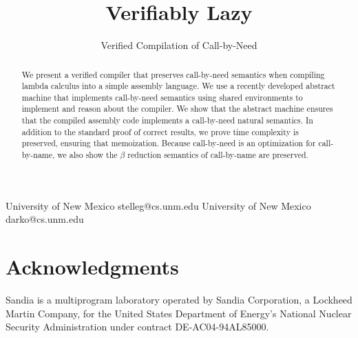 \documentclass[preprint]{sigplanconf}
\begin{document}
\copyrightdata{[to be supplied]} 


\title{Verifiably Lazy}
\subtitle{Verified Compilation of Call-by-Need}

           {University of New Mexico}
           {stelleg@cs.unm.edu}
           {University of New Mexico}
           {darko@cs.unm.edu}
\maketitle

\begin{abstract}
We present a verified compiler that preserves call-by-need semantics when
compiling lambda calculus into a simple assembly language. We use a recently
developed abstract machine that implements call-by-need semantics using shared
environments to implement and reason about the compiler. We show that the
abstract machine ensures that the compiled assembly code implements a
call-by-need natural semantics. In addition to the standard proof of correct
results, we prove time complexity is preserved, ensuring that memoization.
Because call-by-need is an optimization for call-by-name, we also show the
$\beta$ reduction semantics of call-by-name are preserved.
\end{abstract}











\section{Acknowledgments}
Sandia is a multiprogram laboratory operated by Sandia Corporation, a Lockheed Martin Company, for the United States Department of Energy’s National Nuclear Security Administration under contract DE-AC04-94AL85000.



\end{document}
